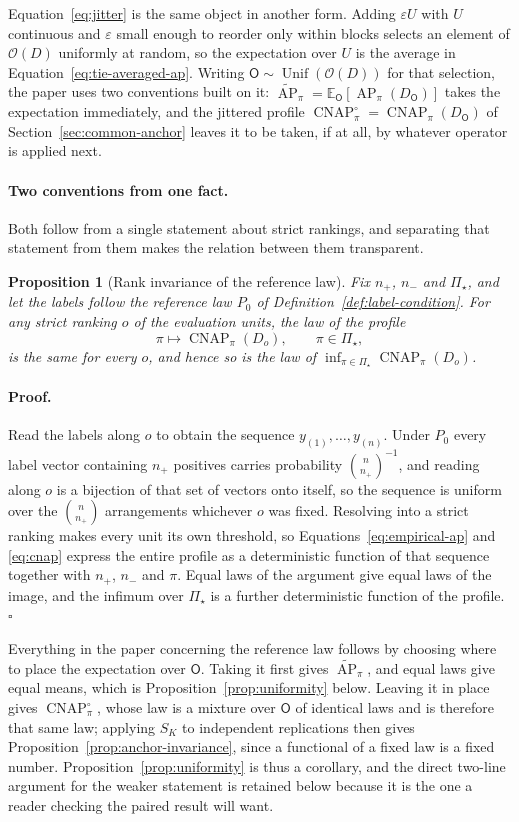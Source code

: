 \documentclass[11pt]{article}
\newcommand{\AP}{\operatorname{AP}}
\newcommand{\CNAP}{\operatorname{CNAP}}
\newcommand{\PSet}{\Pi_\star}
\newcommand{\E}{\mathbb{E}}
\newcommand{\APta}{\widetilde{\AP}}
\newcommand{\Rank}{\mathsf{O}}
\newcommand{\CNAPj}{\CNAP^{\circ}}
\newcommand{\Unif}{\operatorname{Unif}}
\newtheorem{proposition}{Proposition}
\theoremstyle{remark}
\begin{document}
Equation~\eqref{eq:jitter} is the same object in another form. Adding $\varepsilon U$ with $U$ continuous and $\varepsilon$ small enough to reorder only within blocks selects an element of $\mathcal{O}(D)$ uniformly at random, so the expectation over $U$ is the average in Equation~\eqref{eq:tie-averaged-ap}. Writing $\Rank\sim\Unif(\mathcal{O}(D))$ for that selection, the paper uses two conventions built on it: $\APta_\pi=\E_{\Rank}[\AP_\pi(D_{\Rank})]$ takes the expectation immediately, and the jittered profile $\CNAPj_\pi=\CNAP_\pi(D_{\Rank})$ of Section~\ref{sec:common-anchor} leaves it to be taken, if at all, by whatever operator is applied next.

\paragraph{Two conventions from one fact.}
Both follow from a single statement about strict rankings, and separating that statement from them makes the relation between them transparent.

\begin{proposition}[Rank invariance of the reference law]
\label{prop:rank-invariance}
Fix $n_+$, $n_-$ and $\PSet$, and let the labels follow the reference law $P_0$ of Definition~\ref{def:label-condition}. For any strict ranking $o$ of the evaluation units, the law of the profile
\[
\pi\longmapsto\CNAP_\pi(D_o),
\qquad
\pi\in\PSet,
\]
is the same for every $o$, and hence so is the law of $\inf_{\pi\in\PSet}\CNAP_\pi(D_o)$.
\end{proposition}

\paragraph{Proof.}
Read the labels along $o$ to obtain the sequence $y_{(1)},\ldots,y_{(n)}$. Under $P_0$ every label vector containing $n_+$ positives carries probability $\binom{n}{n_+}^{-1}$, and reading along $o$ is a bijection of that set of vectors onto itself, so the sequence is uniform over the $\binom{n}{n_+}$ arrangements whichever $o$ was fixed. Resolving into a strict ranking makes every unit its own threshold, so Equations~\eqref{eq:empirical-ap} and \eqref{eq:cnap} express the entire profile as a deterministic function of that sequence together with $n_+$, $n_-$ and $\pi$. Equal laws of the argument give equal laws of the image, and the infimum over $\PSet$ is a further deterministic function of the profile. $\square$

Everything in the paper concerning the reference law follows by choosing where to place the expectation over $\Rank$. Taking it first gives $\APta_\pi$, and equal laws give equal means, which is Proposition~\ref{prop:uniformity} below. Leaving it in place gives $\CNAPj_\pi$, whose law is a mixture over $\Rank$ of identical laws and is therefore that same law; applying $S_K$ to independent replications then gives Proposition~\ref{prop:anchor-invariance}, since a functional of a fixed law is a fixed number. Proposition~\ref{prop:uniformity} is thus a corollary, and the direct two-line argument for the weaker statement is retained below because it is the one a reader checking the paired result will want.
\end{document}
